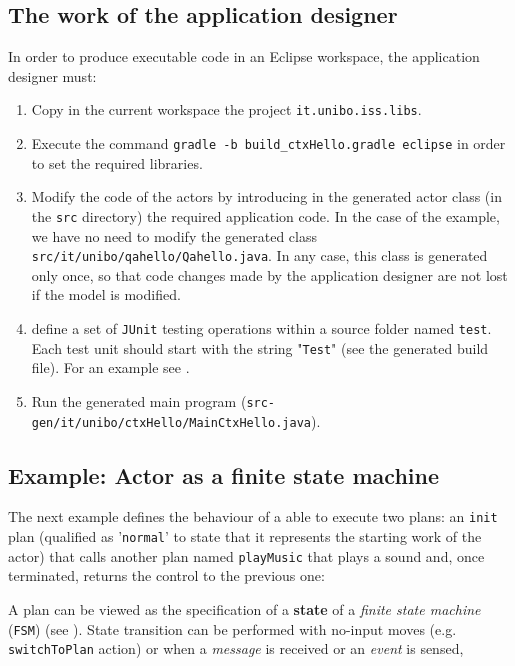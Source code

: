 \subsection{The work of the application designer}

In order to produce executable code in an Eclipse workspace, the application designer must:
 \begin{enumerate}
 \item Copy in the current workspace the project  \texttt{it.unibo.iss.libs}.
 \item Execute the command \texttt{gradle -b build\_ctxHello.gradle eclipse} in order to set the required libraries.
 \item Modify the code of the actors by introducing in the generated actor class (in the \texttt{src} directory) the required application code. In the case of the example, we have no need to modify the generated class \texttt{src/it/unibo/qahello/Qahello.java}. In any case, this class is generated only once, so that code changes made by the application designer are not lost if the model is modified.
 \item define a set of \texttt{JUnit} testing operations within a source folder named \texttt{test}. Each test unit should start with the string "\texttt{Test}" (see the generated build file). For an example see .

 \item Run the generated main program (\texttt{src-gen/it/unibo/ctxHello/MainCtxHello.java}).
 \end{enumerate}



\subsection{Example: Actor as a finite state machine}

The next example defines the behaviour of a \qa{} able to execute two plans: an \texttt{init} plan (qualified as '\texttt{normal}' to state that it represents the starting work of the actor) that calls another plan named \texttt{playMusic} that plays a sound and, once terminated, returns the control to the previous one:

  

A plan can be viewed as the specification of a \textbf{state} of a \textit{finite state machine} (\texttt{FSM}) (see ). State transition can be performed with no-input moves (e.g. \texttt{switchToPlan} action) or  when a \textit{message} is received or an \textit{event} is sensed,



